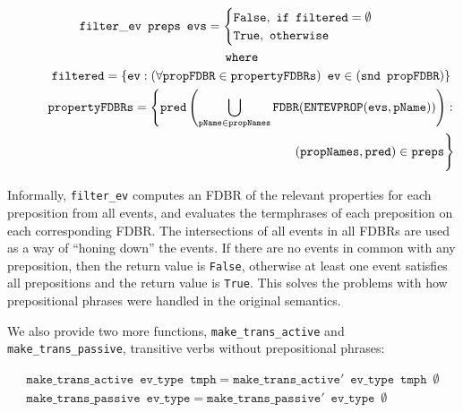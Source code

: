 \documentclass[../main.tex]{subfiles}
\begin{document}
{\setlength{\mathindent}{0cm}
\begin{gather*}
\mathtt{filter\_ev}\enspace \mathtt{preps}\enspace \mathtt{evs} =
\begin{cases}
\mathtt{False},\ \mathtt{if}\enspace \mathtt{filtered} = \mathtt{\emptyset} \\
\mathtt{True},\ \mathtt{otherwise}
\end{cases} \\
\mathtt{\indent where} \\
\mathtt{\indent\indent filtered} = \left\{ \mathtt{ev} : \left( \forall \mathtt{propFDBR} \in
\mathtt{propertyFDBRs} \right)\ \mathtt{ev} \in (\mathtt{snd}\enspace \mathtt{propFDBR}) \right\}  \\
\begin{split}
\mathtt{\indent\indent propertyFDBRs} = \left\{ \mathtt{pred}\left(\bigcup_{\mathtt{pName} \in \mathtt{propNames}} \mathtt{FDBR}(\mathtt{ENTEVPROP}(\mathtt{evs}, \mathtt{pName})) \right) : \right. \\
\left. (\mathtt{propNames}, \mathtt{pred}) \in \mathtt{preps} \vphantom{\bigcup_{\mathtt{pName} \in \mathtt{propNames}}} \right\}
\end{split}
\end{gather*}
}

Informally, \texttt{filter\_ev} computes an FDBR of the relevant properties for
each preposition from all events, and evaluates the termphrases of each
preposition on each corresponding FDBR.  The intersections of all events in all
FDBRs are used as a way
of ``honing down'' the events.  If there are no events in common with any
preposition, then the return value is \texttt{False}, otherwise at least
one event satisfies all prepositions and the return value is \texttt{True}.
This solves the problems with how prepositional phrases were handled in the
original semantics.

We also provide two more functions, \texttt{make\_trans\_active} and \texttt{make\_trans\_passive}, transitive verbs without prepositional phrases:

\begin{gather*}
\mathtt{make\_trans\_active}\enspace \mathtt{ev\_type}\enspace \mathtt{tmph} = \mathtt{make\_trans\_active'}\enspace \mathtt{ev\_type}\enspace \mathtt{tmph}\enspace \mathtt{\emptyset}\\
\mathtt{make\_trans\_passive}\enspace \mathtt{ev\_type} = \mathtt{make\_trans\_passive'}\enspace \mathtt{ev\_type}\enspace \emptyset
\end{gather*}
\end{document}
